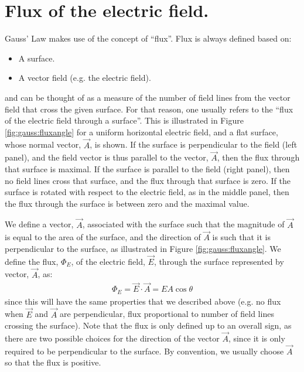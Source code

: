 \section{Flux of the electric field.}
Gauss' Law makes use of the concept of ``flux''. Flux is always defined based on:
\begin{itemize}
\item A surface.
\item A vector field (e.g. the electric field). 
\end{itemize}
and can be thought of as a measure of the number of field lines from the vector field that cross the given surface. For that reason, one usually refers to the ``flux of the electric field through a surface''. This is illustrated in Figure \ref{fig:gauss:fluxangle} for a uniform horizontal electric field, and a flat surface, whose normal vector, $\vec A$, is shown. If the surface is perpendicular to the field (left panel), and the field vector is thus parallel to the vector, $\vec A$, then the flux through that surface is maximal. If the surface is parallel to the field (right panel), then no field lines cross that surface, and the flux through that surface is zero. If the surface is rotated with respect to the electric field, as in the middle panel, then the flux through the surface is between zero and the maximal value.


We define a vector, $\vec A$, associated with the surface such that the magnitude of $\vec A$ is equal to the area of the surface, and the direction of $\vec A$ is such that it is perpendicular to the surface, as illustrated in Figure \ref{fig:gauss:fluxangle}. We define the flux, $\Phi_E$, of the electric field, $\vec E$, through the surface represented by vector, $\vec A$, as:
\begin{align*}
\Phi_E=\vec E\cdot \vec A=EA\cos\theta
\end{align*}
since this will have the same properties that we described above (e.g. no flux when $\vec E$ and $\vec A$ are perpendicular, flux proportional to number of field lines crossing the surface). Note that the flux is only defined up to an overall sign, as there are two possible choices for the direction of the vector $\vec A$, since it is only required to be perpendicular to the surface. By convention, we usually choose $\vec A$ so that the flux is positive.





